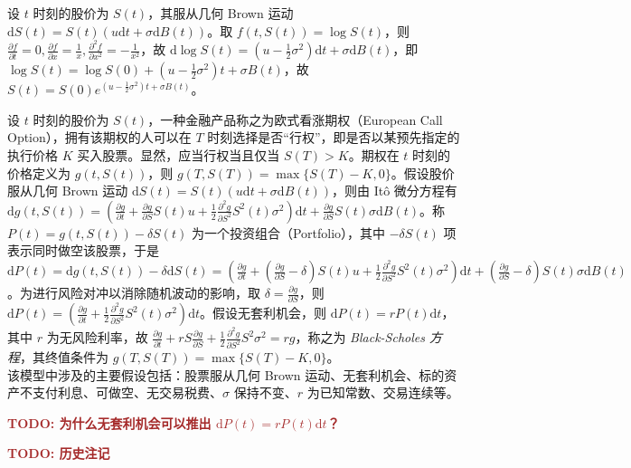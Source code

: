 \documentclass[../main.tex]{subfiles}
\begin{document}
\begin{example}
    设 $t$ 时刻的股价为 $S(t)$，其服从几何 Brown 运动 $\mathrm dS(t)=S(t)(u\mathrm dt+\sigma\mathrm dB(t))$。取 $f(t,S(t))=\log S(t)$，则 $\frac{\partial f}{\partial t}=0,\frac{\partial f}{\partial x}=\frac1x,\frac{\partial^2f}{\partial x^2}=-\frac1{x^2}$，故 $\mathrm d\log S(t)=\left(u-\frac12\sigma^2\right)\mathrm dt+\sigma\mathrm dB(t)$，即 $\log S(t)=\log S(0)+\left(u-\frac12\sigma^2\right)t+\sigma B(t)$，故 $S(t)=S(0)e^{\left(u-\frac12\sigma^2\right)t+\sigma B(t)}$。
\end{example}

\begin{example}
    设 $t$ 时刻的股价为 $S(t)$，一种金融产品称之为欧式看涨期权（European Call Option），拥有该期权的人可以在 $T$ 时刻选择是否“行权”，即是否以某预先指定的执行价格 $K$ 买入股票。显然，应当行权当且仅当 $S(T)>K$。期权在 $t$ 时刻的价格定义为 $g(t,S(t))$，则 $g(T,S(T))=\max\{S(T)-K,0\}$。假设股价服从几何 Brown 运动 $\mathrm dS(t)=S(t)(u\mathrm dt+\sigma\mathrm dB(t))$，则由 It\^o 微分方程有 $\mathrm dg(t,S(t))=\left(\frac{\partial g}{\partial t}+\frac{\partial g}{\partial S}S(t)u+\frac12\frac{\partial^2g}{\partial S^2}S^2(t)\sigma^2\right)\mathrm dt+\frac{\partial g}{\partial S}S(t)\sigma\mathrm dB(t)$。称 $P(t)=g(t,S(t))-\delta S(t)$ 为一个投资组合（Portfolio），其中 $-\delta S(t)$ 项表示同时做空该股票，于是 $\mathrm dP(t)=\mathrm dg(t,S(t))-\delta\mathrm dS(t)=\left(\frac{\partial g}{\partial t}+\left(\frac{\partial g}{\partial S}-\delta\right)S(t)u+\frac12\frac{\partial^2g}{\partial S^2}S^2(t)\sigma^2\right)\mathrm dt+\left(\frac{\partial g}{\partial S}-\delta\right)S(t)\sigma\mathrm dB(t)$。为进行风险对冲以消除随机波动的影响，取 $\delta=\frac{\partial g}{\partial S}$，则 $\mathrm dP(t)=\left(\frac{\partial g}{\partial t}+\frac12\frac{\partial^2g}{\partial S^2}S^2(t)\sigma^2\right)\mathrm dt$。假设无套利机会，则 $\mathrm dP(t)=rP(t)\mathrm dt$，其中 $r$ 为无风险利率，故 $\frac{\partial g}{\partial t}+rS\frac{\partial g}{\partial S}+\frac12\frac{\partial^2g}{\partial S^2}S^2\sigma^2=rg$，称之为 \emph{Black-Scholes 方程}，其终值条件为 $g(T,S(T))=\max\{S(T)-K,0\}$。\\
    该模型中涉及的主要假设包括：股票服从几何 Brown 运动、无套利机会、标的资产不支付利息、可做空、无交易税费、$\sigma$ 保持不变、$r$ 为已知常数、交易连续等。
\end{example}

\textbf{\textcolor{brown}{TODO: 为什么无套利机会可以推出 $\mathrm dP(t)=rP(t)\mathrm dt$？}}

\textbf{\textcolor{brown}{TODO: 历史注记}}
\end{document}
